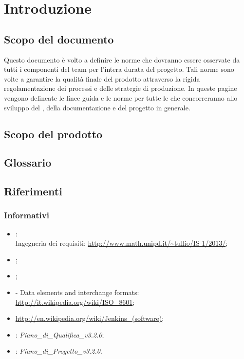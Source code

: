 \newpage
\section{Introduzione}%
\label{1.0}
\subsection{Scopo del documento}%
\label{1.1}
Questo documento è volto a definire le norme che dovranno essere osservate da tutti i componenti del team per l'intera durata del progetto. Tali norme sono volte a garantire la qualità finale del prodotto attraverso la rigida regolamentazione dei processi e delle strategie di produzione. In queste pagine vengono delineate le linee guida e le norme per tutte le  che concorreranno allo sviluppo del , della documentazione e del progetto in generale.

\subsection{Scopo del prodotto}
\label{1.2}
\Prodotto{}

\subsection{Glossario}%
\label{1.3}
\Glossario{}

\subsection{Riferimenti} %
\label{1.4}
\subsubsection{Informativi}
\begin{itemize}
\item {}:\\
Ingegneria dei requisiti: \url{http://www.math.unipd.it/~tullio/IS-1/2013/};
\item {};\\
\item {};\\
\item {} - Data elements and interchange formats: \url{http://it.wikipedia.org/wiki/ISO\_8601};
\item {} \url{http://en.wikipedia.org/wiki/Jenkins_(software)};
\item {}: \emph{Piano\_di\_Qualifica\_v3.2.0};
\item {}: \emph{Piano\_di\_Progetto\_v3.2.0}.
\end{itemize}

